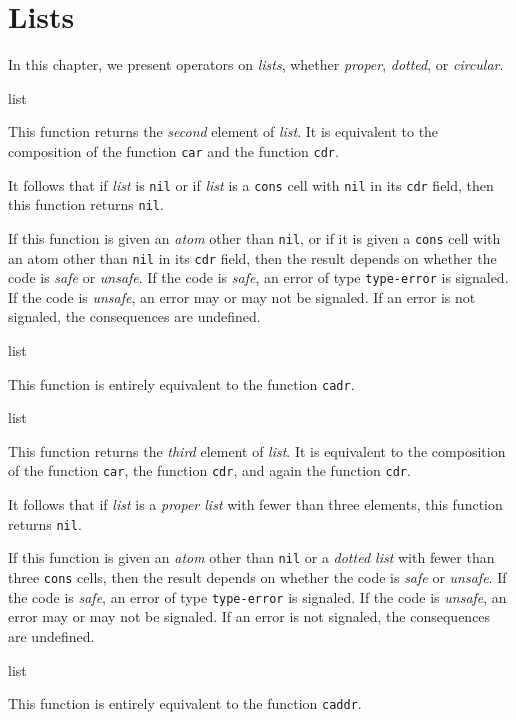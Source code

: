 \chapter{Lists}

In this chapter, we present operators on \emph{lists}, whether
\emph{proper}, \emph{dotted}, or \emph{circular}.  

 {list}

This function returns the \emph{second} element of \textit{list}.  It
is equivalent to the composition of the function \texttt{car} and the
function \texttt{cdr}.  

It follows that if \textit{list} is \texttt{nil} or if \textit{list}
is a \texttt{cons} cell with \texttt{nil} in its \texttt{cdr} field,
then this function returns \texttt{nil}.  

If this function is given an \emph{atom} other than \texttt{nil}, or
if it is given a \texttt{cons} cell with an atom other than
\texttt{nil} in its \texttt{cdr} field, then the result depends on
whether the code is \emph{safe} or \emph{unsafe}.  If the code is
\emph{safe}, an error of type \texttt{type-error} is signaled.  If the
code is \emph{unsafe}, an error may or may not be signaled.  If an
error is not signaled, the consequences are undefined.

 {list}

This function is entirely equivalent to the function \texttt{cadr}. 

 {list}

This function returns the \emph{third} element of \textit{list}.  It
is equivalent to the composition of the function \texttt{car}, the
function \texttt{cdr}, and again the function \texttt{cdr}.

It follows that if \textit{list} is a \emph{proper list} with fewer
than three elements, this function returns \texttt{nil}.

If this function is given an \emph{atom} other than \texttt{nil} or a
\emph{dotted list} with fewer than three \texttt{cons} cells, then the
result depends on whether the code is \emph{safe} or \emph{unsafe}.
If the code is \emph{safe}, an error of type \texttt{type-error} is
signaled.  If the code is \emph{unsafe}, an error may or may not be
signaled.  If an error is not signaled, the consequences are
undefined.

 {list}

This function is entirely equivalent to the function \texttt{caddr}. 

